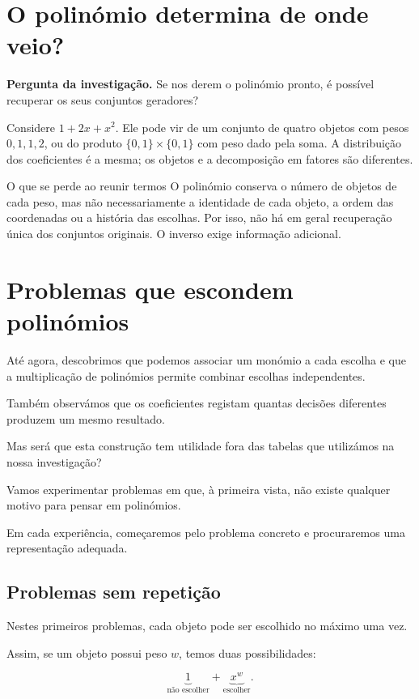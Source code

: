 \documentclass[11pt,a4paper,oneside]{book}
\newcommand{\Pergunta}[1]{\begin{perguntabox}\textbf{Pergunta da investigação.} #1\end{perguntabox}}
\begin{document}
\section{O polinómio determina de onde veio?}
\Pergunta{Se nos derem o polinómio pronto, é possível recuperar os seus conjuntos geradores?}
Considere $1+2x+x^2$. Ele pode vir de um conjunto de quatro objetos com pesos $0,1,1,2$, ou do produto $\{0,1\}\times\{0,1\}$ com peso dado pela soma. A distribuição dos coeficientes é a mesma; os objetos e a decomposição em fatores são diferentes.
\begin{observacaobox}{O que se perde ao reunir termos}
O polinómio conserva o número de objetos de cada peso, mas não necessariamente a identidade de cada objeto, a ordem das coordenadas ou a história das escolhas. Por isso, não há em geral recuperação única dos conjuntos originais. O inverso exige informação adicional.
\end{observacaobox}


\section{Problemas que escondem polinómios}

Até agora, descobrimos que podemos associar
um monómio a cada escolha e que a
multiplicação de polinómios permite
combinar escolhas independentes.

Também observámos que os coeficientes
registam quantas decisões diferentes
produzem um mesmo resultado.

Mas será que esta construção tem utilidade
fora das tabelas que utilizámos
na nossa investigação?

Vamos experimentar problemas em que,
à primeira vista, não existe qualquer
motivo para pensar em polinómios.

Em cada experiência, começaremos pelo
problema concreto e procuraremos uma
representação adequada.

\subsection{Problemas sem repetição}

Nestes primeiros problemas, cada objeto
pode ser escolhido no máximo uma vez.

Assim, se um objeto possui peso $w$,
temos duas possibilidades:

\[
\underbrace{1}_{\text{não escolher}}
+
\underbrace{x^w}_{\text{escolher}}.
\]
\end{document}
